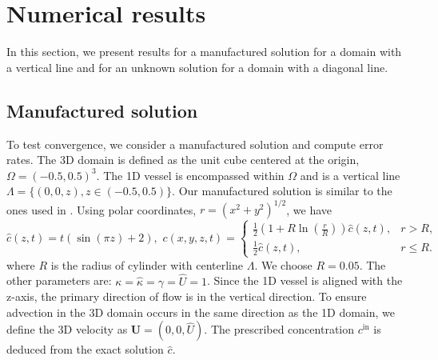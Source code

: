 \documentclass[pdflatex,sn-mathphys-num]{sn-jnl}%
\newcommand{\bfU}{{\boldsymbol U}}
\theoremstyle{thmstyleone}%
\theoremstyle{thmstyletwo}%
\theoremstyle{thmstylethree}%
\begin{document}
\section{Numerical results}
\label{sec:numerics}
In this section, we present results for a manufactured solution for a domain with a vertical line and for an unknown solution for a domain with a diagonal line. 

\subsection{Manufactured solution} 
\label{sec:manufactured}

To test convergence, we consider a manufactured solution and compute error rates. The 3D domain is defined as the unit cube centered at the origin, $\Omega = (-0.5,0.5)^3$. The 1D vessel is encompassed within $\Omega$ and is a vertical line $\Lambda = \{(0,0,z), z\in(-0.5,0.5)\}$. Our manufactured solution is  similar to the ones used in  \cite{Masri24,Zunino19}. 
Using polar coordinates, $r = (x^2+y^2)^{1/2}$, we have
\[
\hat c(z,t) = t \left(\sin(\pi z)+2\right), \,\,
    c(x,y,z,t) =  \begin{cases}
        \frac12 \left(1+R\ln\left(\frac{r}{R}\right)\right)\hat{c}(z,t), & r>R, \\
    \frac12 \hat{c}(z,t), & r\leq R.
    \end{cases} 
\]
where $R$ is the radius of cylinder with centerline $\Lambda$. We choose $R=0.05$. 
The other parameters are: $\kappa=\hat\kappa = \gamma = \hat U = 1$.  Since the 1D vessel is aligned with the z-axis, the primary direction of flow is in the vertical direction.  To ensure advection in the 3D domain occurs in the same direction as the 1D domain, we define the 3D velocity as  $\bfU=(0,0,\hat U)$. The prescribed concentration $c^\mathrm{in}$ is deduced from the exact solution $\hat c$.%
\end{document}
